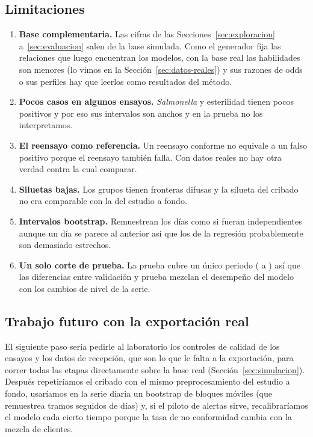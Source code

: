 \subsection{Limitaciones}

\begin{enumerate}[label=\alph*.]
    \item \textbf{Base complementaria.} Las cifras de las
          Secciones~\ref{sec:exploracion} a~\ref{sec:evaluacion} salen de la
          base simulada. Como el generador fija las relaciones que luego
          encuentran los modelos, con la base real las habilidades son menores
          (lo vimos en la Sección~\ref{sec:datos-reales}) y sus razones de
          odds o sus perfiles hay que leerlos como resultados del método.
    \item \textbf{Pocos casos en algunos ensayos.} \textit{Salmonella} y
          esterilidad tienen pocos positivos y por eso sus intervalos son
          anchos y en la prueba no los interpretamos.
    \item \textbf{El reensayo como referencia.} Un reensayo conforme no
          equivale a un falso positivo porque el reensayo también falla. Con
          datos reales no hay otra verdad contra la cual comparar.
    \item \textbf{Siluetas bajas.} Los grupos tienen fronteras difusas y la
          silueta del cribado no era comparable con la del estudio a fondo.
    \item \textbf{Intervalos bootstrap.} Remuestrean los días como si fueran
          independientes aunque un día se parece al anterior así que los de
          la regresión probablemente son demasiado estrechos.
    \item \textbf{Un solo corte de prueba.} La prueba cubre un único periodo
          (\FinPruebaDesde{} a \FinPruebaHasta{}) así que las diferencias
          entre validación y prueba mezclan el desempeño del modelo con los
          cambios de nivel de la serie.
\end{enumerate}


\subsection{Trabajo futuro con la exportación real}

El siguiente paso sería pedirle al laboratorio los controles de calidad de
los ensayos y los datos de recepción, que son lo que le falta a la
exportación, para correr todas las etapas directamente sobre la base real
(Sección~\ref{sec:simulacion}). Después repetiríamos el cribado con el mismo preprocesamiento del estudio a fondo,
usaríamos en la serie diaria un bootstrap de bloques móviles (que remuestrea
tramos seguidos de días) y, si el piloto de alertas sirve, recalibraríamos el
modelo cada cierto tiempo porque la tasa de no conformidad cambia con la
mezcla de clientes.
